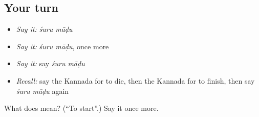 \subsection*{Your turn}
\begin{itemize}
\raggedright
  \item \emph{Say it:} \emph{śuru māḍu}
  \item \emph{Say it:} \emph{śuru māḍu}, once more
  \item \emph{Say it:} say \emph{śuru māḍu}
  \item \emph{Recall:} say the Kannada for to die, then the Kannada for to finish, then say \emph{śuru māḍu} again
\end{itemize}

\begin{tcolorbox}[breakable,colback=teal!4,colframe=teal!35!black,title={Before you move on}]
What does   mean? (\textquotedblleft{}To start\textquotedblright{}.) Say it once more.
\end{tcolorbox}
